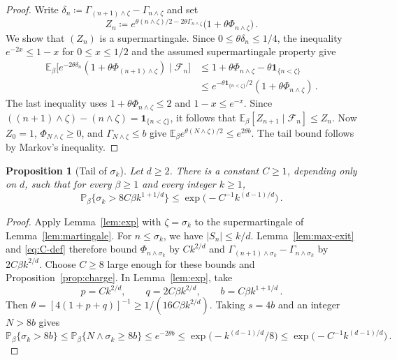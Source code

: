 \documentclass[11pt]{amsart}
\theoremstyle{plain}
\newtheorem{proposition}[theorem]{Proposition}
\theoremstyle{definition}
\renewcommand{\P}{\mathbb P}
\newcommand{\E}{\mathbb E}
\newcommand{\one}{\mathbf 1}
\begin{document}
	\begin{proof}
		Write $\delta_n\coloneqq\Gamma_{(n+1)\wedge\zeta}-\Gamma_{n\wedge\zeta}$
		and set
		\[
		Z_n\coloneqq e^{\theta(n\wedge\zeta)/2-2\theta\Gamma_{n\wedge\zeta}}
		\bigl(1+\theta\Phi_{n\wedge\zeta}\bigr)\, .
		\]
		We show that $(Z_n)$ is a supermartingale.
		Since $0\leq\theta\delta_n\leq1/4$, the inequality
		$e^{-2x}\leq1-x$ for $0\leq x\leq1/2$ and the assumed supermartingale
		property give
		\begin{align*}
		\E_\beta\bigl[e^{-2\theta\delta_n}
		(1+\theta\Phi_{(n+1)\wedge\zeta})\mid\mathcal F_n\bigr]
		&\leq1+\theta\Phi_{n\wedge\zeta}-\theta\one_{\{n<\zeta\}}\\
		&\leq e^{-\theta\one_{\{n<\zeta\}}/2}
		(1+\theta\Phi_{n\wedge\zeta})\, .
		\end{align*}
		The last inequality uses $1+\theta\Phi_{n\wedge\zeta}\leq2$ and
		$1-x\leq e^{-x}$.  Since
		$((n+1)\wedge\zeta)-(n\wedge\zeta)=\one_{\{n<\zeta\}}$, it follows that
		$\E_\beta[Z_{n+1}\mid\mathcal F_n]\leq Z_n$.
		Now $Z_0=1$, $\Phi_{N\wedge\zeta}\geq0$, and $\Gamma_{N\wedge\zeta}\leq b$ give
		$\E_\beta e^{\theta(N\wedge\zeta)/2}\leq e^{2\theta b}$.
		The tail bound follows by Markov's inequality.
	\end{proof}

	\begin{proposition}[Tail of $\sigma_k$]\label{prop:tail}
		Let $d\geq2$. There is a constant $C\geq1$, depending only on $d$, such
		that for every $\beta\geq1$ and every integer $k\geq1$,
		\[
			\P_\beta\bigl\{\sigma_k>8C\beta k^{1+1/d}\bigr\}
			\leq\exp\bigl(-C^{-1}k^{(d-1)/d}\bigr)\, .
		\]
	\end{proposition}

	\begin{proof}
		Apply Lemma~\ref{lem:exp} with $\zeta=\sigma_k$ to the supermartingale
		of Lemma~\ref{lem:martingale}.  For $n\leq\sigma_k$, we have $|S_n|\leq k/d$.
		Lemma~\ref{lem:max-exit} and \eqref{eq:C-def} therefore bound
		$\Phi_{n\wedge\sigma_k}$ by $Ck^{2/d}$ and
		$\Gamma_{(n+1)\wedge\sigma_k}-\Gamma_{n\wedge\sigma_k}$ by $2C\beta k^{2/d}$.
		Choose $C\geq8$ large enough for these bounds and
		Proposition~\ref{prop:charge}. In Lemma~\ref{lem:exp}, take
		\[
		p=Ck^{2/d},\qquad q=2C\beta k^{2/d},\qquad
		b=C\beta k^{1+1/d}\, .
		\]
		Then $\theta=[4(1+p+q)]^{-1}\geq1/(16C\beta k^{2/d})$.
		Taking $s=4b$ and an integer $N>8b$ gives
		\[
		\P_\beta\{\sigma_k>8b\}
		\leq\P_\beta\{N\wedge\sigma_k\geq8b\}
		\leq e^{-2\theta b}\leq\exp\bigl(-k^{(d-1)/d}/8\bigr)
		\leq\exp\bigl(-C^{-1}k^{(d-1)/d}\bigr)\, .
		\]
	\end{proof}
\end{document}
